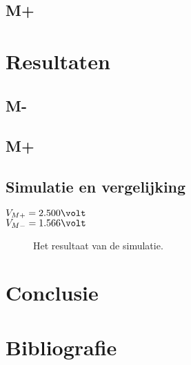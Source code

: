 \documentclass{scrartcl}  %
\begin{document}
\subsection{M+}
\label{subsec:trig-methode-plus}


\section{Resultaten}
\label{sec:trig-res}
\subsection{M-}
\label{subsec:trig-res-minus}

\subsection{M+}
\label{subsec:trig-res-plus}

\subsection{Simulatie en vergelijking}
\label{subsec:trig-res-verg}
$V_{M+} = 2.500 \volt$\\
$V_{M-} = 1.566 \volt$
\begin{figure}[H]
\centering
	\setlength{} 
	\setlength{}
	
	\caption{Het resultaat van de simulatie.}
	\label{fig:st}
\end{figure}

\section{Conclusie}
\label{sec:trig-conclusie}

\newpage
{}
\section{Bibliografie}
\printbibliography
\end{document}
